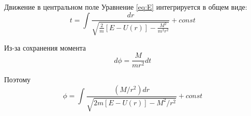 \documentclass[14pt]{beamer}
\begin{document}
\begin{frame}{Движение в центральном поле}
Уравнение \eqref{eq:E} интегрируется в общем виде:
\begin{equation}
t=\int \frac{dr}{\sqrt{\frac{2}{m}[E-U(r)]-\frac{M^2}{m^2r^2}}} + const
\end{equation}

Из-за сохранения момента
\begin{equation*}
d\phi=\frac{M}{mr^2}dt
\end{equation*}

Поэтому
\begin{equation}
\phi=\int \frac{(M/r^2)dr}{\sqrt{2m[E-U(r)]-M^2/r^2}} + const
\end{equation}

\end{frame}
\end{document}
